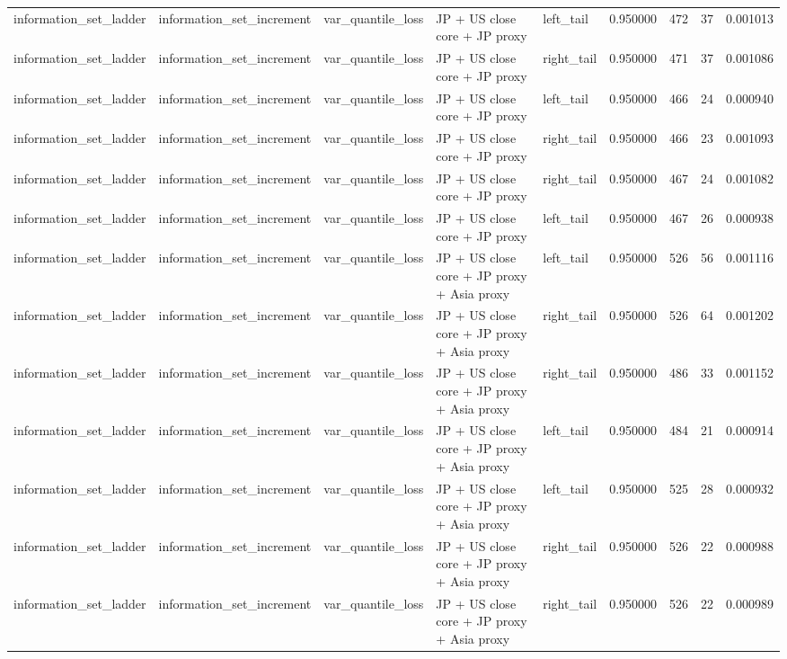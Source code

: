 \begin{tabular}{lllllrrrr}
information\_set\_ladder & information\_set\_increment & var\_quantile\_loss & JP + US close core + JP proxy & left\_tail & 0.950000 & 472 & 37 & 0.001013 \\
information\_set\_ladder & information\_set\_increment & var\_quantile\_loss & JP + US close core + JP proxy & right\_tail & 0.950000 & 471 & 37 & 0.001086 \\
information\_set\_ladder & information\_set\_increment & var\_quantile\_loss & JP + US close core + JP proxy & left\_tail & 0.950000 & 466 & 24 & 0.000940 \\
information\_set\_ladder & information\_set\_increment & var\_quantile\_loss & JP + US close core + JP proxy & right\_tail & 0.950000 & 466 & 23 & 0.001093 \\
information\_set\_ladder & information\_set\_increment & var\_quantile\_loss & JP + US close core + JP proxy & right\_tail & 0.950000 & 467 & 24 & 0.001082 \\
information\_set\_ladder & information\_set\_increment & var\_quantile\_loss & JP + US close core + JP proxy & left\_tail & 0.950000 & 467 & 26 & 0.000938 \\
information\_set\_ladder & information\_set\_increment & var\_quantile\_loss & JP + US close core + JP proxy + Asia proxy & left\_tail & 0.950000 & 526 & 56 & 0.001116 \\
information\_set\_ladder & information\_set\_increment & var\_quantile\_loss & JP + US close core + JP proxy + Asia proxy & right\_tail & 0.950000 & 526 & 64 & 0.001202 \\
information\_set\_ladder & information\_set\_increment & var\_quantile\_loss & JP + US close core + JP proxy + Asia proxy & right\_tail & 0.950000 & 486 & 33 & 0.001152 \\
information\_set\_ladder & information\_set\_increment & var\_quantile\_loss & JP + US close core + JP proxy + Asia proxy & left\_tail & 0.950000 & 484 & 21 & 0.000914 \\
information\_set\_ladder & information\_set\_increment & var\_quantile\_loss & JP + US close core + JP proxy + Asia proxy & left\_tail & 0.950000 & 525 & 28 & 0.000932 \\
information\_set\_ladder & information\_set\_increment & var\_quantile\_loss & JP + US close core + JP proxy + Asia proxy & right\_tail & 0.950000 & 526 & 22 & 0.000988 \\
information\_set\_ladder & information\_set\_increment & var\_quantile\_loss & JP + US close core + JP proxy + Asia proxy & right\_tail & 0.950000 & 526 & 22 & 0.000989 \\

\end{tabular}
